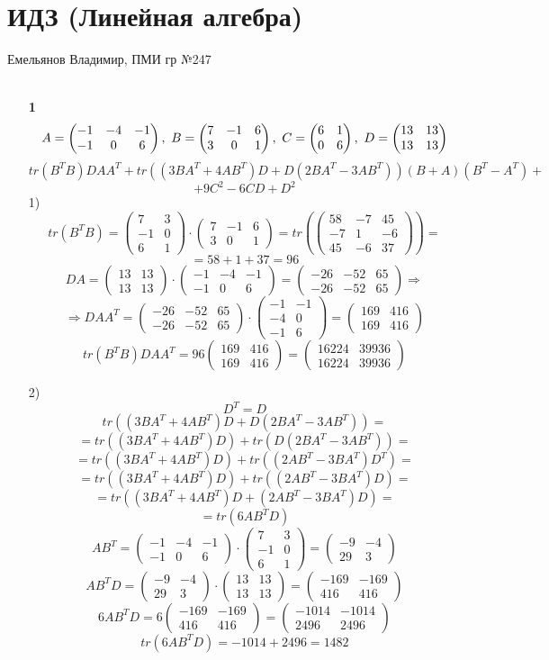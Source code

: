 \documentclass[a4paper]{article}
\newcommand{\mat}[1]{\begin{pmatrix} #1 \end{pmatrix}}
\newcommand{\ts}{\text{\space}}
\renewcommand{\r}{\Rightarrow}
\begin{document}
\section*{ИДЗ (Линейная алгебра)}
{\large Емельянов Владимир, ПМИ гр №247}\\\\
\begin{enumerate}
    \item[\textbf{1}]
    $$A = \mat{-1 & -4 & -1 \\ -1 & 0 & 6}, \ts B = \mat{7 & -1 & 6 \\ 3 & 0 & 1}, \ts C = \mat{6 & 1 \\ 0 & 6}, \ts D = \mat{13 & 13 \\ 13 & 13}$$
    $$tr(B^TB)DAA^T+tr((3BA^T+4AB^T)D+D(2BA^T-3AB^T))(B+A)(B^T-A^T)+$$
    $$+9C^2-6CD + D^2$$
    1)$$tr(B^TB) = \mat{7 & 3  \\ -1 & 0  \\ 6 & 1 }\cdot \mat{7 & -1 & 6 \\ 3 & 0 & 1} = tr(\mat{58 & -7 & 45 \\ -7 & 1 & -6 \\ 45 & -6 & 37}) = $$
    $$= 58+1+37 = 96$$
    $$DA = \mat{13 & 13 \\ 13 & 13} \cdot \mat{-1 & -4 & -1 \\ -1 & 0 & 6} = \mat{-26 & -52 & 65 \\ -26 & -52 & 65} \r $$
    $$\r DAA^T = \mat{-26 & -52 & 65 \\ -26 & -52 & 65} \cdot \mat{-1 & -1  \\ -4 & 0 \\ -1 & 6  } = \mat{169 & 416 \\ 169 & 416}$$
    $$tr(B^TB)DAA^T = 96\mat{169 & 416 \\ 169 & 416} = \mat{16224 & 39936 \\ 16224 & 39936}$$
    
    2)$$D^T = D$$
    $$tr((3BA^T+4AB^T)D+D(2BA^T-3AB^T)) = $$
    $$=tr((3BA^T+4AB^T)D) + tr(D(2BA^T-3AB^T)) = $$
    $$=tr((3BA^T+4AB^T)D) + tr((2AB^T-3BA^T)D^T) = $$
    $$=tr((3BA^T+4AB^T)D) + tr((2AB^T-3BA^T)D) = $$
    $$=tr((3BA^T+4AB^T)D+(2AB^T-3BA^T)D) = $$
    $$=tr(6AB^TD)$$
    $$AB^T = \mat{-1 & -4 & -1 \\ -1 & 0 & 6} \cdot \mat{7 & 3  \\ -1 & 0  \\ 6 & 1 } = \mat{-9 & -4 \\ 29 & 3}$$
    $$AB^TD = \mat{-9 & -4 \\ 29 & 3} \cdot \mat{13 & 13 \\ 13 & 13} = \mat{-169 & -169 \\ 416 & 416}$$
    $$6AB^TD = 6\mat{-169 & -169 \\ 416 & 416} = \mat{-1014 & -1014 \\ 2496 & 2496}$$
    $$tr(6AB^TD) = -1014+2496=1482$$


\end{enumerate}
\end{document}
